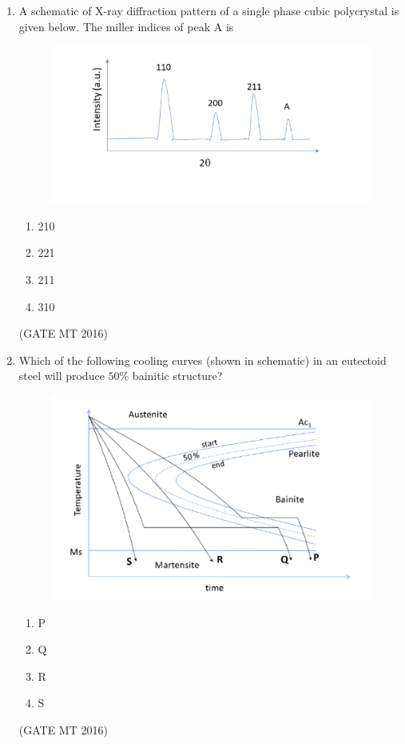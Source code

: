 \documentclass[journal, 11pt, onecolumn]{IEEEtran}
\theoremstyle{remark}
\begin{document}
\begin{enumerate}
\item A schematic of X-ray diffraction pattern of a single phase cubic polycrystal is given below. The miller indices of peak A is

\begin{figure}[H]
    \centering
    \includegraphics[width=0.5\linewidth]{figs/a6f1.png}
    \caption{}
    \label{fig:placeholder}
\end{figure}

\begin{multicols}{2}
\begin{enumerate}
\item 210
\item 221
\item 211
\item 310
\end{enumerate}
\end{multicols}
\hfill(GATE MT 2016)

\item Which of the following cooling curves (shown in schematic) in an eutectoid steel will produce $50\%$ bainitic structure?

\begin{figure}[H]
    \centering
    \includegraphics[width=0.5\linewidth]{figs/a6f2.png}
    \label{fig:placeholder}
\end{figure}

\begin{multicols}{4}
\begin{enumerate}
\item P
\item Q
\item R
\item S
\end{enumerate}
\end{multicols}
\hfill(GATE MT 2016)


\end{enumerate}
\end{document}
